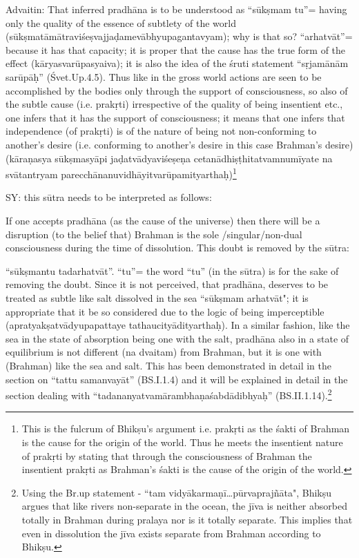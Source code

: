 Advaitin: That inferred pradhāna is to be understood as “sūkṣmam tu”=   having only the quality of the essence of subtlety of the world (sūkṣmatāmātraviśeṣvajjaḍamevābhyupagantavyam); why is that so? “arhatvāt”= because it has that capacity; it is proper that the cause has the true form of the effect (kāryasvarūpasyaiva); it is also the idea of the śruti statement “sṛjamānām sarūpāḥ” (Śvet.Up.4.5). Thus like in the gross world actions are seen to be accomplished by the bodies only through the support of consciousness, so also of the subtle cause (i.e. prakṛti) irrespective of the quality of being insentient etc., one infers that it has the support of consciousness; it means that one infers that independence (of prakṛti)  is of the nature of being not non-conforming to another’s desire (i.e. conforming to another’s desire in this case Brahman’s desire) (kāraṇasya sūkṣmasyāpi jaḍatvādyaviśeṣeṇa cetanādhiṣṭhitatvamnumīyate na svātantryam parecchānanuvidhāyitvarūpamityarthaḥ)\footnote{This is the fulcrum of Bhikṣu’s argument i.e. prakṛti as the śakti of Brahman is the cause for the origin of the world. Thus he meets the insentient nature of prakṛti by stating that through the consciousness of Brahman the insentient prakṛti as Brahman’s śakti is the cause of the origin of the world.}

SY: this sūtra needs to be interpreted as follows:

If one accepts pradhāna (as the cause of the universe) then there will be a disruption (to the belief that) Brahman is the sole /singular/non-dual consciousness during the time of dissolution. This doubt is removed by the sūtra: 

“sūkṣmantu tadarhatvāt”. “tu”= the word “tu” (in the sūtra) is for the sake of removing the doubt. Since it is not perceived, that pradhāna, deserves to be treated as subtle like salt dissolved in the sea ``sūkṣmam arhatvāt"; it is appropriate that it be so considered due to the logic of being imperceptible  (apratyakṣatvādyupapattaye tathaucityādityarthaḥ). In a similar fashion, like the sea in the state of absorption being one with the salt, pradhāna also in a state of equilibrium is not different (na dvaitam) from Brahman, but it is one with (Brahman) like the sea and salt. This has been demonstrated in detail in the section on “tattu samanvayāt” (BS.I.1.4) and it will be explained in detail in the section dealing with “tadananyatvamārambhaṇaśabdādibhyaḥ” (BS.II.1.14).\footnote{Using the Br.up statement - ``tam vidyākarmaṇī…pūrvaprajñāta", Bhikṣu argues that like rivers non-separate in the ocean, the jīva is neither absorbed totally in Brahman during pralaya nor is it totally separate. This implies that even in dissolution the jīva exists separate from Brahman according to Bhikṣu.}

